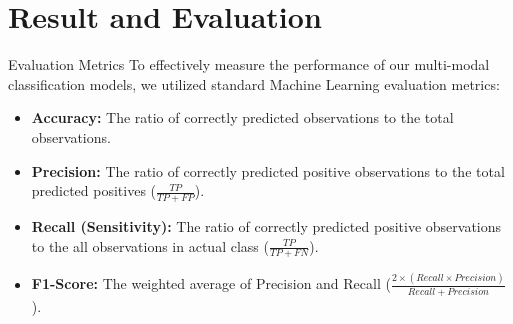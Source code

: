 \documentclass[11pt]{beamer}
\begin{document}
\section{Result and Evaluation}

\begin{frame}{Evaluation Metrics}
    \justifying
    To effectively measure the performance of our multi-modal classification models, we utilized standard Machine Learning evaluation metrics:
    \begin{itemize}
        \item \textbf{Accuracy:} The ratio of correctly predicted observations to the total observations.
        \item \textbf{Precision:} The ratio of correctly predicted positive observations to the total predicted positives ($\frac{TP}{TP + FP}$).
        \item \textbf{Recall (Sensitivity):} The ratio of correctly predicted positive observations to the all observations in actual class ($\frac{TP}{TP + FN}$).
        \item \textbf{F1-Score:} The weighted average of Precision and Recall ($\frac{2 \times (Recall \times Precision)}{Recall + Precision}$).
    \end{itemize}
\end{frame}
\end{document}
